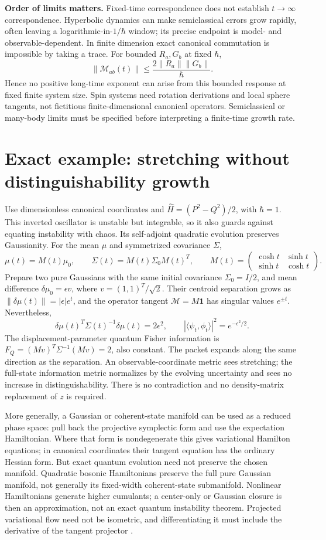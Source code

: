 \documentclass[11pt,a4paper]{article}
\newcommand{\id}{\mathbf{1}}
\begin{document}
\textbf{Order of limits matters.} Fixed-time correspondence does not establish $t\to\infty$ correspondence. Hyperbolic dynamics can make semiclassical errors grow rapidly, often leaving a logarithmic-in-$1/\hbar$ window; its precise endpoint is model- and observable-dependent. In finite dimension exact canonical commutation is impossible by taking a trace. For bounded $R_a,G_b$ at fixed $\hbar$,
\[\|\mathcal M_{ab}(t)\|\leq\frac{2\|R_a\|\|G_b\|}{\hbar}.\]
Hence no positive long-time exponent can arise from this bounded response at fixed finite system size. Spin systems need rotation derivations and local sphere tangents, not fictitious finite-dimensional canonical operators. Semiclassical or many-body limits must be specified before interpreting a finite-time growth rate.

\section{Exact example: stretching without distinguishability growth}
Use dimensionless canonical coordinates and $\widehat H=(P^2-Q^2)/2$, with $\hbar=1$. This inverted oscillator is unstable but integrable, so it also guards against equating instability with chaos. Its self-adjoint quadratic evolution preserves Gaussianity. For the mean $\mu$ and symmetrized covariance $\Sigma$,
\[\mu(t)=M(t)\mu_0,\qquad\Sigma(t)=M(t)\Sigma_0M(t)^T,\qquad M(t)=\begin{pmatrix}\cosh t&\sinh t\\\sinh t&\cosh t\end{pmatrix}.\]
Prepare two pure Gaussians with the same initial covariance $\Sigma_0=I/2$, and mean difference $\delta\mu_0=\epsilon v$, where $v=(1,1)^T/\sqrt2$. Their centroid separation grows as $\|\delta\mu(t)\|=|\epsilon|e^t$, and the operator tangent $\mathcal M=M\id$ has singular values $e^{\pm t}$. Nevertheless,
\[\delta\mu(t)^T\Sigma(t)^{-1}\delta\mu(t)=2\epsilon^2,\qquad|\langle\psi_t,\phi_t\rangle|^2=e^{-\epsilon^2/2}.\]
The displacement-parameter quantum Fisher information is $F_Q=(M v)^T\Sigma^{-1}(M v)=2$, also constant. The packet expands along the same direction as the separation. An observable-coordinate metric sees stretching; the full-state information metric normalizes by the evolving uncertainty and sees no increase in distinguishability. There is no contradiction and no density-matrix replacement of $z$ is required.

More generally, a Gaussian or coherent-state manifold can be used as a reduced phase space: pull back the projective symplectic form and use the expectation Hamiltonian. Where that form is nondegenerate this gives variational Hamilton equations; in canonical coordinates their tangent equation has the ordinary Hessian form. But exact quantum evolution need not preserve the chosen manifold. Quadratic bosonic Hamiltonians preserve the full pure Gaussian manifold, not generally its fixed-width coherent-state submanifold. Nonlinear Hamiltonians generate higher cumulants; a center-only or Gaussian closure is then an approximation, not an exact quantum instability theorem. Projected variational flow need not be isometric, and differentiating it must include the derivative of the tangent projector \cite[pp.~35--37]{hackl}.
\end{document}
